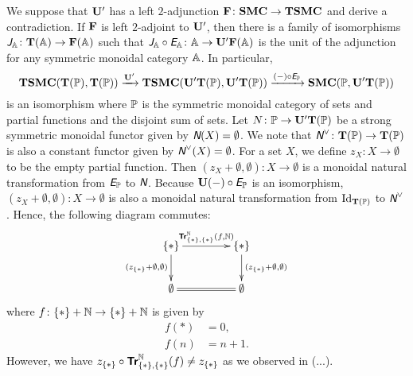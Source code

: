 We suppose that $\mathbf{U}'$ has a left $2$-adjunction $\mathbf{F} \colon \mathbf{SMC} \to
\mathbf{TSMC}$ and derive a contradiction. If $\mathbf{F}$ is left $2$-adjoint to
$\mathbf{U}'$, then there is a family of isomorphisms $\textit{\textsf{J}}_{\mathbb{A}}
\colon \mathbf T(\mathbb{A}) \to \mathbf{F}(\mathbb{A})$ such that $\textit{\textsf{J}}_{\mathbb{A}} \circ
\textit{\textsf{E}}_{\mathbb{A}} \colon \mathbb{A} \to \mathbf{U}'\mathbf{F}(\mathbb{A})$ is the unit of the
adjunction for any symmetric monoidal category $\mathbb{A}$. In
particular,
\begin{equation*}
  \mathbf{TSMC}(\mathbf T(\mathbb{\mathbb{P}}),\mathbf T(\mathbb{\mathbb{P}})) \xrightarrow{\mathbf{U}'}
  \mathbf{TSMC}(\mathbf{U}'\mathbf T(\mathbb{\mathbb{P}}),\mathbf{U}'\mathbf T(\mathbb{\mathbb{P}})) \xrightarrow{(-) \circ \textit{\textsf{E}}_{\mathbb{\mathbb{P}}}}
  \mathbf{SMC}(\mathbb{P},\mathbf{U}'\mathbf T(\mathbb{\mathbb{P}}))
\end{equation*}
is an isomorphism where $\mathbb{P}$ is the symmetric monoidal category of
sets and partial functions and the disjoint sum of sets. Let $N
\colon \mathbb{P} \to \mathbf{U}'\mathbf T(\mathbb{\mathbb{P}})$ be a strong symmetric monoidal functor
given by $\textit{\textsf{N}}(X) = \emptyset$. We note that $\textit{\textsf{N}}^{\vee} \colon \mathbf T(\mathbb{\mathbb{P}})
\to \mathbf T(\mathbb{\mathbb{P}})$ is also a constant functor given by $\textit{\textsf{N}}^{\vee}(X) =
\emptyset$. For a set $X$, we define $z_{X} \colon X \to
\emptyset$ to be the empty partial function. Then $(z_{X} +
\emptyset,\emptyset) \colon X \to \emptyset$ is a monoidal natural
transformation from $\textit{\textsf{E}}_{\mathbb{\mathbb{P}}}$ to $\textit{\textsf{N}}$. Because $\mathbf{U}(-) \circ
\textit{\textsf{E}}_{\mathbb{\mathbb{P}}}$ is an isomorphism, $(z_{X} + \emptyset,\emptyset)
\colon X \to \emptyset$ is also a monoidal natural transformation
from $\mbox{Id}_{\mathbf T(\mathbb{\mathbb{P}})}$ to $\textit{\textsf{N}}^{\vee}$. Hence, the following diagram
commutes:
\begin{equation*}
  \xymatrix@C=15mm{
    \{\ast\} \ar[r]^{\Tr{\NN}_{\{\ast\},\{\ast\}}(f,\NN)}
    \ar[d]_{(z_{\{\ast\}} + \emptyset,\emptyset)} &
    \{\ast\} \ar[d]^{(z_{\{\ast\}} + \emptyset,\emptyset)} \\
    \emptyset \ar@{=}[r] &
    \emptyset
  }
\end{equation*}
where $f \colon \{\ast\} + \mathbb N \to \{\ast\} + \mathbb N$ is given by
\begin{align*}
  f(\ast) &= 0, \\
  f(n) &= n+1.
\end{align*}
However, we have $z_{\{\ast\}} \circ {\normalfont\textsf{\textbf{Tr}}}^{\mathbb N}_{\{\ast\},\{\ast\}}(f) \neq z_{\{\ast\}}$
as we observed in (...).
